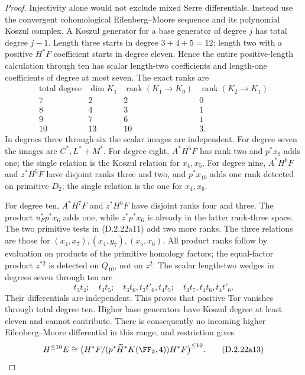 \begin{proof}
Injectivity alone would not exclude mixed Serre differentials.
Instead use the convergent cohomological Eilenberg--Moore sequence
\cite[p.334]{FGHMay1968} and its polynomial Koszul complex.
A Koszul generator for a base generator of degree $j$ has total
degree $j-1$. Length three starts in degree $3+4+5=12$;
length two with a positive $H^*F$ coefficient starts in degree
eleven. Hence the entire positive-length calculation through ten
has scalar length-two coefficients and length-one coefficients
of degree at most seven. The exact ranks are
\[
\begin{array}{c|ccc}
 \text{total degree}&\dim K_1&\operatorname{rank}(K_1\to K_0)
 &\operatorname{rank}(K_2\to K_1)\\\hline
 7&2&2&0\\
 8&4&3&1\\
 9&7&6&1\\
 10&13&10&3.
\end{array}
\tag{D.2.22a12}
\]
In degrees three through six the scalar images are independent.
For degree seven the images are $C^*,L^*+M^*$.
For degree eight, $A^*H^5F$ has rank two and $p^*x_9$
adds one; the single relation is the Koszul relation for
$x_4,x_5$. For degree nine, $A^*H^6F$ and $z^*H^5F$
have disjoint ranks three and two, and $p^*x_{10}$ adds one
rank detected on primitive $D_2$; the single relation is
the one for $x_4,x_6$.

For degree ten, $A^*H^7F$ and $z^*H^6F$ have disjoint ranks
four and three. The product $u_F^*p^*x_6$ adds one, while
$z^*p^*x_6$ is already in the latter rank-three space.
The two primitive tests in \textup{(D.2.22a11)} add two more
ranks. The three relations are those for
$(x_4,x_7),(x_4,y_7),(x_5,x_6)$.
All product ranks follow by evaluation on products of the
primitive homology factors; the equal-factor product $z^{*2}$
is detected on $Q_{10}$, not on $z^2$.
The scalar length-two wedges in degrees seven through ten are
\[
 t_3t_4;\quad t_3t_5;\quad
 t_3t_6,t_3t'_6,t_4t_5;\quad
 t_3t_7,t_4t_6,t_4t'_6.
\]
Their differentials are independent. This proves that positive
Tor vanishes through total degree ten. Higher base generators
have Koszul degree at least eleven and cannot contribute.
There is consequently no incoming higher Eilenberg--Moore
differential in this range, and restriction gives
\[
 H^{\le10}E\cong
 \bigl(H^*F/(p^*\widetilde H^*K(\FF_2,4))H^*F\bigr)^{\le10}.
 \tag{D.2.22a13}
\]


\end{proof}
